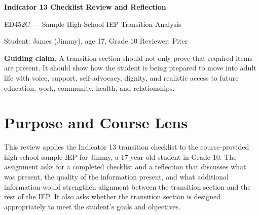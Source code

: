 \documentclass[11pt]{article}
\begin{document}
{\LARGE\bfseries\color{PrimaryRed} Indicator 13 Checklist Review and Reflection\par}
{\large ED452C --- Sample High-School IEP Transition Analysis\par}
\vspace{0.2em}
{\normalsize Student: James (Jimmy), age 17, Grade 10 \hfill Reviewer: Piter\par}

\vspace{0.55em}
\begin{center}
\end{center}

\begin{ReflectionBox}
\textbf{Guiding claim.} A transition section should not only prove that required items are present. It should show how the student is being prepared to move into adult life with voice, support, self-advocacy, dignity, and realistic access to future education, work, community, health, and relationships.
\end{ReflectionBox}

\section{Purpose and Course Lens}

This review applies the Indicator 13 transition checklist to the course-provided high-school sample IEP for Jimmy, a 17-year-old student in Grade 10. The assignment asks for a completed checklist and a reflection that discusses what was present, the quality of the information present, and what additional information would strengthen alignment between the transition section and the rest of the IEP. It also asks whether the transition section is designed appropriately to meet the student's goals and objectives.
\end{document}
